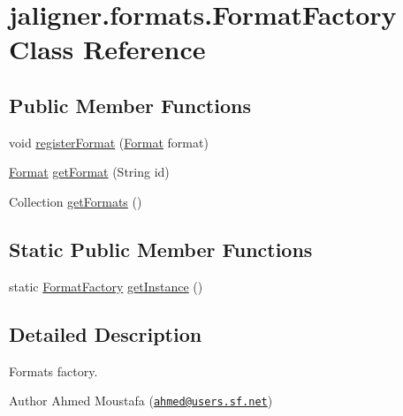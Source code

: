 \hypertarget{classjaligner_1_1formats_1_1_format_factory}{\section{jaligner.\+formats.\+Format\+Factory Class Reference}
\label{classjaligner_1_1formats_1_1_format_factory}
}
\subsection*{Public Member Functions}
\begin{DoxyCompactItemize}
\item 
void \hyperlink{classjaligner_1_1formats_1_1_format_factory_ae7177983d52809916c1bd004255dda87}{register\+Format} (\hyperlink{classjaligner_1_1formats_1_1_format}{Format} format)
\item 
\hyperlink{classjaligner_1_1formats_1_1_format}{Format} \hyperlink{classjaligner_1_1formats_1_1_format_factory_a2ec3d952de23c5cc649f03a804a1f739}{get\+Format} (String id)
\item 
Collection \hyperlink{classjaligner_1_1formats_1_1_format_factory_abe01131f3b213cf76e28c7ff1f137a4c}{get\+Formats} ()
\end{DoxyCompactItemize}
\subsection*{Static Public Member Functions}
\begin{DoxyCompactItemize}
\item 
static \hyperlink{classjaligner_1_1formats_1_1_format_factory}{Format\+Factory} \hyperlink{classjaligner_1_1formats_1_1_format_factory_a985e04230615fa0dd275cf1852da7824}{get\+Instance} ()
\end{DoxyCompactItemize}


\subsection{Detailed Description}
Formats factory.

\begin{DoxyAuthor}{Author}
Ahmed Moustafa (\href{mailto:ahmed@users.sf.net}{\tt ahmed@users.\+sf.\+net}) 
\end{DoxyAuthor}


